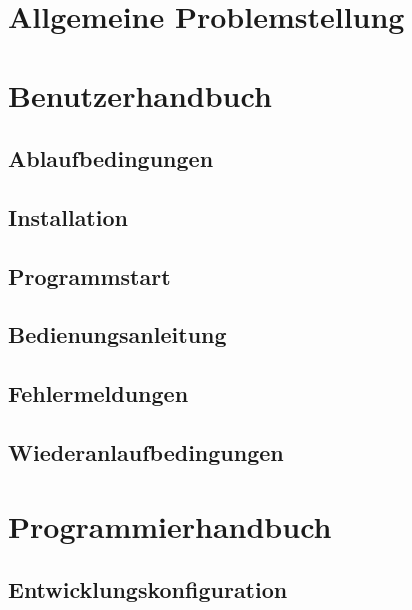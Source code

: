 \documentclass[a4paper,10pt]{scrreprt}
\title{}
\author{}
\begin{document}
\maketitle

\chapter{Allgemeine Problemstellung}
\label{chap:allgemeine-problemstellung}

\chapter{Benutzerhandbuch}
\label{chap:benutzerhandbuch}

\section{Ablaufbedingungen}
\label{sec:ablaufbedingungen}

\section{Installation}
\label{sec:installation}

\section{Programmstart}
\label{sec:programmstart}

\section{Bedienungsanleitung}
\label{sec:bedienungsanleitung}

\section{Fehlermeldungen}
\label{sec:fehlermeldungen}

\section{Wiederanlaufbedingungen}
\label{sec:wiederanlaufbedingungen}

\chapter{Programmierhandbuch}
\label{chap:Programmierhandbuch}

\section{Entwicklungskonfiguration}
\label{sec:entwicklungskonfiguration}
\end{document}
